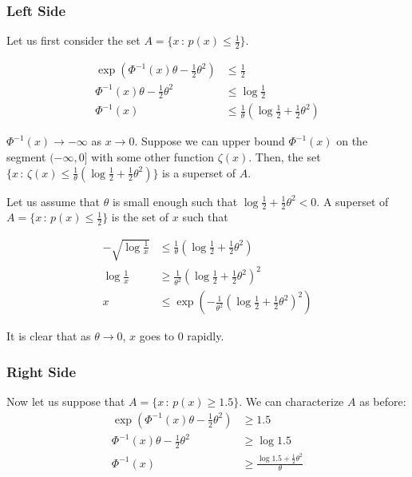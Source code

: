 \documentclass{article}
\begin{document}
\subsubsection{Left Side}

Let us first consider the set $A = \{ x \,:\, p(x) \leq \frac{1}{2}\}$. 

\begin{align*}
\exp\left( \Phi^{-1}(x) \theta - \frac{1}{2} \theta^2 \right) &\leq \frac{1}{2}  \\
\Phi^{-1}(x) \theta - \frac{1}{2} \theta^2 &\leq \log \frac{1}{2} \\
\Phi^{-1}(x) &\leq \frac{1}{\theta} \left(\log \frac{1}{2} + \frac{1}{2} \theta^2\right) 
\end{align*}

$\Phi^{-1}(x) \rightarrow -\infty$ as $x \rightarrow 0$. Suppose we can upper bound $\Phi^{-1}(x)$ on the segment $(-\infty, 0]$ with some other function $\zeta(x)$. 
Then, the set $\{ x \,:\, \zeta(x) \leq \frac{1}{\theta} \left( \log \frac{1}{2} + \frac{1}{2} \theta^2 \right) \}$ is a superset of $A$. 

 Let us assume that $\theta$ is small enough such that $\log \frac{1}{2} + \frac{1}{2} \theta^2 < 0$. 
A superset of $A = \{ x \,:\, p(x) \leq \frac{1}{2} \}$ is the set of $x$ such that

\begin{align*}
-\sqrt{\log \frac{1}{x}} &\leq \frac{1}{\theta} \left( \log \frac{1}{2} + \frac{1}{2}\theta^2 \right) \\
\log \frac{1}{x} &\geq \frac{1}{\theta^2} \left( \log \frac{1}{2} + \frac{1}{2} \theta^2 \right)^2 \\
x & \leq \exp \left( - \frac{1}{\theta^2} \left( \log \frac{1}{2} + \frac{1}{2} \theta^2 \right)^2 \right)
\end{align*}

It is clear that as $\theta \rightarrow 0$, $x$ goes to 0 rapidly. 

\subsubsection{Right Side}

Now let us suppose that $A = \{ x \,:\, p(x) \geq 1.5\}$. We can characterize $A$ as before:
\begin{align*}
\exp( \Phi^{-1}(x) \theta - \frac{1}{2} \theta^2 ) &\geq 1.5 \\
\Phi^{-1}(x) \theta - \frac{1}{2} \theta^2 &\geq \log 1.5 \\
\Phi^{-1}(x) &\geq \frac{ \log 1.5 + \frac{1}{2}\theta^2}{\theta} 
\end{align*}
\end{document}
